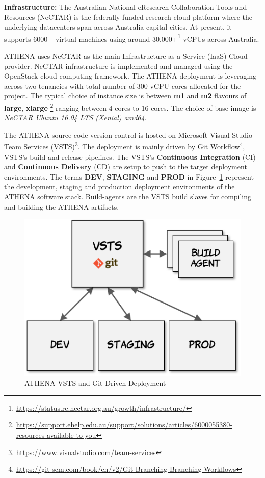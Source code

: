 \noindent \textbf{Infrastructure:} \quad The Australian National eResearch Collaboration Tools and Resources (NeCTAR) is the federally funded research cloud platform where the underlying datacenters span across Australia capital cities. At present, it supports 6000+ virtual machines using around 30,000+\footnote{\url{https://status.rc.nectar.org.au/growth/infrastructure/}} vCPUs across Australia.

ATHENA uses NeCTAR as the main Infrastructure-as-a-Service (IaaS) Cloud provider. NeCTAR infrastructure is implemented and managed using the OpenStack cloud computing framework. The ATHENA deployment is leveraging across two tenancies with total number of 300 vCPU cores allocated for the project. The typical choice of instance size is between \textbf{m1} and \textbf{m2} flavours of \textbf{large}, \textbf{xlarge} \footnote{\url{https://support.ehelp.edu.au/support/solutions/articles/6000055380-resources-available-to-you}} ranging between 4 cores to 16 cores. The choice of base image is \textit{NeCTAR Ubuntu 16.04 LTS (Xenial) amd64}.

The ATHENA source code version control is hosted on Microsoft Visual Studio Team Services (VSTS)\footnote{\url{https://www.visualstudio.com/team-services}}. The deployment is mainly driven by Git Workflow\footnote{\url{https://git-scm.com/book/en/v2/Git-Branching-Branching-Workflows}}, VSTS's build and release pipelines. The VSTS's \textbf{Continuous Integration} (CI) and \textbf{Continuous Delivery} (CD) \parencite{httermann2012devops} are setup to push to the target deployment environments. The terms \textbf{DEV}, \textbf{STAGING} and \textbf{PROD} in Figure~\ref{fig:deployVSTS} represent the development, staging and production deployment environments of the ATHENA software stack. Build-agents are the VSTS build slaves for compiling and building the ATHENA artifacts.

\begin{figure}[H]
\centering
\includegraphics[width=0.3\paperwidth]{Figures/ATHENA_deploy_vsts}
\decoRule
\caption[ATHENA VSTS and Git]{ATHENA VSTS and Git Driven Deployment}
\label{fig:deployVSTS}
\end{figure}

